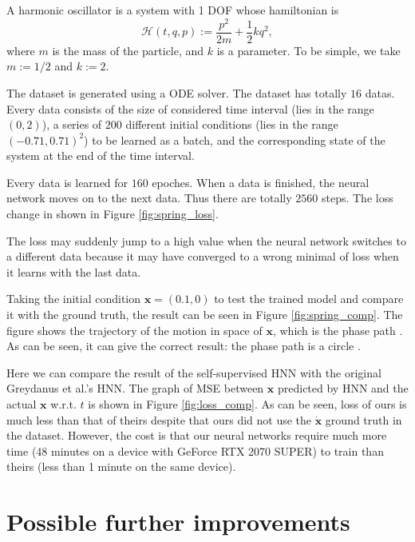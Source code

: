 \documentclass{article}
\begin{document}
A harmonic oscillator is a system with 1 DOF whose hamiltonian is \cite[p. 157]{landau1976mechanics}
\begin{equation*}
	\mathcal H\left(t,q,p\right):=\frac{p^2}{2m}+\frac12kq^2,
\end{equation*}
where $m$ is the mass of the particle, and $k$ is a parameter.
To be simple, we take $m:=1/2$ and $k:=2$.

The dataset is generated using a ODE solver.
The dataset has totally $16$ datas.
Every data consists of the size of considered time interval
(lies in the range $\left(0,2\right)$),
a series of $200$ different initial conditions
(lies in the range $\left(-0.71,0.71\right)^2$)
to be learned as a batch,
and the corresponding state of the system at the end of the time interval.

Every data is learned for $160$ epoches.
When a data is finished, the neural network moves on to the next data.
Thus there are totally $2560$ steps.
The loss change in shown in Figure \ref{fig:spring_loss}.

The loss may suddenly jump to a high value when the neural network switches to a different data
because it may have converged to a wrong minimal of loss when it learns with the last data.

Taking the initial condition $\mathbf x=\left(0.1,0\right)$
to test the trained model and compare it with the ground truth,
the result can be seen in Figure \ref{fig:spring_comp}.
The figure shows the trajectory of the motion in space of $\mathbf x$,
which is the phase path \cite[p. 146]{landau1976mechanics}\cite[p. 68]{arnold1989mathmech}.
As can be seen, it can give the correct result:
the phase path is a circle \cite[p. 17]{arnold1989mathmech}.

Here we can compare the result of the self-supervised HNN with the original Greydanus et al.'s HNN.
The graph of MSE between $\mathbf x$ predicted by HNN and the actual $\mathbf x$ w.r.t. $t$ is shown in Figure \ref{fig:loss_comp}.
As can be seen, loss of ours is much less than that of theirs
despite that ours did not use the $\dot{\mathbf x}$ ground truth in the dataset.
However, the cost is that our neural networks require much more time
(48 minutes on a device with GeForce RTX 2070 SUPER) to train
than theirs (less than 1 minute on the same device).

\section{Possible further improvements}
\end{document}
